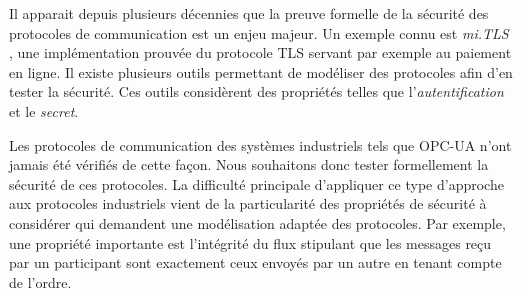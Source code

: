 \documentclass{article}
\begin{document}
Il apparait depuis plusieurs décennies que la preuve formelle de
la sécurité des protocoles de communication est un enjeu majeur.
Un exemple connu est {\em mi.TLS} \cite{BFKPS13}, une implémentation prouvée
du protocole TLS \cite{DR08} servant par exemple au paiement en ligne.
Il existe plusieurs outils permettant de modéliser des protocoles afin d'en
tester la sécurité.
Ces outils considèrent des propriétés telles que l'{\em autentification}
et le {\em secret}.

Les protocoles de communication des systèmes industriels tels que OPC-UA n'ont
jamais été vérifiés de cette façon.
Nous souhaitons donc tester formellement la sécurité de ces protocoles.%
La difficulté principale d'appliquer ce type d'approche aux protocoles
industriels vient de la particularité des propriétés de sécurité à considérer
qui demandent une modélisation adaptée des protocoles.
Par exemple, une propriété importante est l'intégrité du flux stipulant que les
messages reçu par un participant sont exactement ceux envoyés par un autre en
tenant compte de l'ordre.
\end{document}

